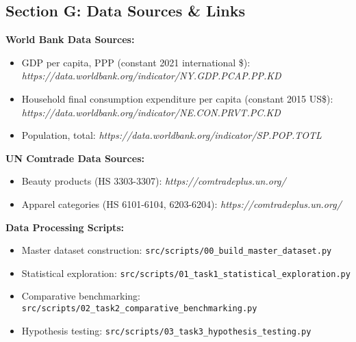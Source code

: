 \documentclass[11pt]{article}
\begin{document}
\subsection*{Section G: Data Sources \& Links}

\textbf{World Bank Data Sources:}
\begin{itemize}
    \item GDP per capita, PPP (constant 2021 international \$): \textit{https://data.worldbank.org/indicator/NY.GDP.PCAP.PP.KD}
    \item Household final consumption expenditure per capita (constant 2015 US\$): \textit{https://data.worldbank.org/indicator/NE.CON.PRVT.PC.KD}
    \item Population, total: \textit{https://data.worldbank.org/indicator/SP.POP.TOTL}
\end{itemize}

\textbf{UN Comtrade Data Sources:}
\begin{itemize}
    \item Beauty products (HS 3303-3307): \textit{https://comtradeplus.un.org/}
    \item Apparel categories (HS 6101-6104, 6203-6204): \textit{https://comtradeplus.un.org/}
\end{itemize}

\textbf{Data Processing Scripts:}
\begin{itemize}  
    \item Master dataset construction: \texttt{src/scripts/00\_build\_master\_dataset.py}
    \item Statistical exploration: \texttt{src/scripts/01\_task1\_statistical\_exploration.py}
    \item Comparative benchmarking: \texttt{src/scripts/02\_task2\_comparative\_benchmarking.py}
    \item Hypothesis testing: \texttt{src/scripts/03\_task3\_hypothesis\_testing.py}
\end{itemize}
\end{document}
